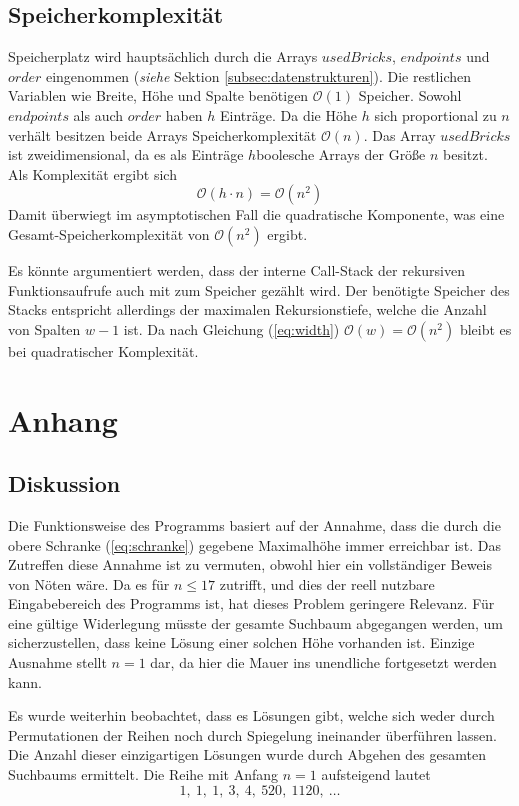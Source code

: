 \documentclass[a4paper, 12pt]{scrartcl}
\begin{document}
\subsection{Speicherkomplexität}
Speicherplatz wird hauptsächlich durch die Arrays $usedBricks$, $endpoints$ und $order$ eingenommen (\emph{siehe} Sektion \ref{subsec:datenstrukturen}). Die restlichen Variablen wie Breite, Höhe und Spalte benötigen $\mathcal{O}(1)$ Speicher. Sowohl $endpoints$ als auch $order$ haben $h$ Einträge. Da die Höhe $h$ sich proportional zu $n$ verhält besitzen beide Arrays Speicherkomplexität $\mathcal{O}(n)$. Das Array $usedBricks$ ist zweidimensional, da es als Einträge $h$boolesche Arrays der Größe $n$ besitzt. Als Komplexität ergibt sich
\begin{equation*}
	\mathcal{O}(h \cdot n) = \mathcal{O}(n^2)
\end{equation*}
Damit überwiegt im asymptotischen Fall die quadratische Komponente, was eine Gesamt-Speicherkomplexität von $\mathcal{O}(n^2)$ ergibt.

Es könnte argumentiert werden, dass der interne Call-Stack der rekursiven Funktionsaufrufe auch mit zum Speicher gezählt wird. Der benötigte Speicher des Stacks entspricht allerdings der maximalen Rekursionstiefe, welche die Anzahl von Spalten $w-1$ ist. Da nach Gleichung (\ref{eq:width}) $\mathcal{O}(w) = \mathcal{O}(n^2)$ bleibt es bei quadratischer Komplexität.
\newpage
\section{Anhang}
\subsection*{Diskussion}
Die Funktionsweise des Programms basiert auf der Annahme, dass die durch die obere Schranke (\ref{eq:schranke}) gegebene Maximalhöhe immer erreichbar ist. Das Zutreffen diese Annahme ist zu vermuten, obwohl hier ein vollständiger Beweis von Nöten wäre. Da es für $n \le 17$ zutrifft, und dies der reell nutzbare Eingabebereich des Programms ist, hat dieses Problem geringere Relevanz. Für eine gültige Widerlegung müsste der gesamte Suchbaum abgegangen werden, um sicherzustellen, dass keine Lösung einer solchen Höhe vorhanden ist. Einzige Ausnahme stellt $n=1$ dar, da hier die Mauer ins unendliche fortgesetzt werden kann.

Es wurde weiterhin beobachtet, dass es Lösungen gibt, welche sich weder durch Permutationen der Reihen noch durch Spiegelung ineinander überführen lassen. Die Anzahl dieser einzigartigen Lösungen wurde durch Abgehen des gesamten Suchbaums ermittelt. Die Reihe mit Anfang $n=1$ aufsteigend lautet
\begin{equation*}
	1,\ 1,\ 1,\ 3,\ 4,\ 520,\ 1120,\ \dots
\end{equation*}
\end{document}
